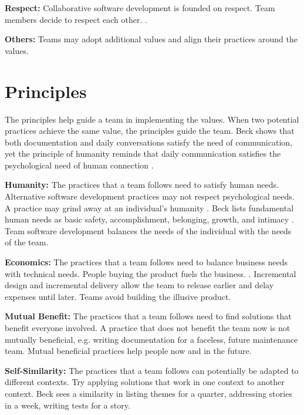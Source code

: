 \textbf{Respect:} Collaborative software development is founded on respect. Team members decide to respect each other.  \cite{BeckExtremeProgramming2004}.

\textbf{Others:} Teams may adopt additional values and align their practices around the values. 

\section{Principles}
The principles help guide a team in implementing the values. When two potential practices achieve the same value,  the principles guide the team. Beck shows that both documentation and daily conversations satisfy the need of communication, yet the principle of humanity reminds that daily communication satisfies the psychological need of human connection \cite{BeckExtremeProgramming2004}.

\textbf{Humanity:} The practices that a team follows need to satisfy human needs. Alternative software development practices may not respect psychological needs. A practice may grind away at an individual’s humanity \cite{BeckExtremeProgramming2004}. Beck lists fundamental human needs as basic safety, accomplishment, belonging, growth, and intimacy \cite{BeckExtremeProgramming2004}. Team software development balances the needs of the individual with the needs of the team. 

\textbf{Economics:} The practices that a team follows need to balance business needs with technical needs\quotes. People buying the product fuels the business.  \cite{BeckExtremeProgramming2004}. Incremental design and incremental delivery allow the team to release earlier and delay expenses until later. Teams avoid building the illusive  product.

\textbf{Mutual Benefit:} The practices that a team follows need to find solutions that benefit everyone involved. A practice that does not benefit the team now is not mutually beneficial, e.g. writing documentation for a faceless, future maintenance team. Mutual beneficial practices help people now and in the future. 


\textbf{Self-Similarity:} The practices that a team follows can potentially be adapted to different contexts. Try applying solutions that work in one context to another context. Beck sees a similarity in listing themes for a quarter, addressing stories in a week, writing tests for a story.

